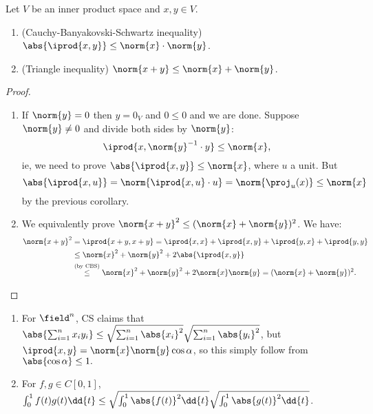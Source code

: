 \begin{theorem}
    Let $V$ be an inner product space and $x, y \in V$. \begin{enumerate}[label=(\alph*)]
        \item (Cauchy-Banyakovski-Schwartz inequality) $\abs{\iprod{x, y}} \leq \norm{x}\cdot \norm{y}$.
        \item (Triangle inequality) $\norm{x + y} \leq \norm{x} + \norm{y}$.
    \end{enumerate}
\end{theorem}

\begin{proof}
    \begin{enumerate}[label=(\alph*)]
        \item If $\norm{y} = 0$ then $y = 0_V$ and $0 \leq 0$ and we are done. Suppose $\norm{y} \neq 0$ and divide both sides by $\norm{y}$:
        \[
        \iprod{x, \norm{y}^{-1}\cdot y} \leq \norm{x},
        \]
        ie, we need to prove $\abs{\iprod{x, y}} \leq \norm{x}$, where $u$ a unit. But \[
        \abs{\iprod{x, u}} = \norm{\iprod{x, u} \cdot u} = \norm{\proj_u(x)} \leq \norm{x}
        \]
        by the previous corollary.

        \item We equivalently prove $\norm{x + y}^2 \leq (\norm{x} + \norm{y})^2$. We have: \begin{align*}
            \norm{x +y }^2 &= \iprod{x + y, x + y} = \iprod{x, x} + \iprod{x, y} + \iprod{y, x} + \iprod{y, y}\\
            &\leq \norm{x}^2 + \norm{y}^2 + 2 \abs{\iprod{x, y}}\\
            &\overset{\text{(by CBS)}}\leq \norm{x}^2 + \norm{y}^2 + 2 \norm{x} \norm{y} = (\norm{x} + \norm{y})^2.
        \end{align*}
    \end{enumerate}
\end{proof}

\begin{example}
    \begin{enumerate}
        \item For $\field^n$, CS claims that $\abs{\sum_{i=1}^n x_i y_i} \leq \sqrt{\sum_{i=1}^n \abs{x_i}^2} \sqrt{\sum_{i=1}^n \abs{y_i}^2}$, but $\iprod{x, y} = \norm{x} \norm{y} \cos{\alpha}$, so this simply follow from $\abs{\cos \alpha} \leq 1.$
        \item For $f, g \in C[0, 1]$, $\int_0^1 f(t) g(t) \dd{t} \leq \sqrt{\int_0^1 \abs{f(t)}^2 \dd{t}} \sqrt{\int_0^1 \abs{g(t)}^2 \dd{t}}$.
    \end{enumerate}
\end{example}

